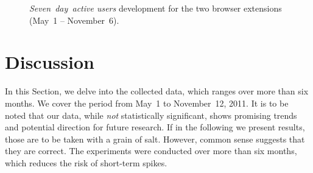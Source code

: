 \documentclass{iosart2c}
\begin{document}
\begin{figure}
  \centering
    \quad
\caption{\textit{Seven~day~active users} development for the two browser extensions (May~1 -- November~6).}
\label{fig:swarmnlpstats}
\end{figure}

\section{Discussion} \label{sec:discussion}
In this Section, we delve into the collected data, which ranges over more than six months.
We cover the period from May~1 to November~12, 2011.
It is to be noted that our data, while \emph{not} statistically significant, shows promising trends and potential direction for future research.
If in the following we present results, those are to be taken with a grain of salt.
However, common sense suggests that they are correct.
The experiments were conducted over more than six months, which reduces the risk of short-term spikes.
\end{document}
